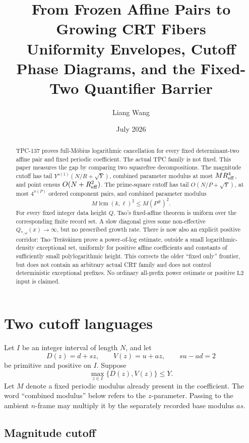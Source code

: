 \documentclass[11pt]{article}
\title{\textbf{From Frozen Affine Pairs to Growing CRT Fibers}\\
\large Uniformity Envelopes, Cutoff Phase Diagrams, and the
Fixed-Two Quantifier Barrier}
\author{Liang Wang}
\date{July 2026}
\theoremstyle{definition}
\theoremstyle{remark}
\newcommand{\Ltwo}{\mathrm{L2}}
\begin{document}
\maketitle

\begin{abstract}
TPC-137 proves full-M\"obius logarithmic cancellation for every
fixed determinant-two affine pair and fixed periodic coefficient.
The actual TPC family is not fixed.  This paper measures the gap by
comparing two squarefree decompositions.  The magnitude cutoff has
tail \(Y^{o(1)}(N/R+\sqrt Y)\), combined parameter modulus at most
\(MR_{\rm eff}^4\), and point census \(O(N+R_{\rm eff}^2)\).  The
prime-square cutoff has tail \(O(N/P+\sqrt Y)\), at most
\(4^{\pi(P)}\) ordered component pairs, and combined parameter
modulus
\[
 M\operatorname{lcm}(k,\ell)^2\le M(P^\#)^2.
\]
For every fixed integer data height \(Q\), Tao's fixed-affine
theorem is uniform over the corresponding finite record set.
A slow diagonal gives some non-effective
\(Q_{*,\omega}(x)\to\infty\), but no prescribed growth rate.
There is now also an explicit positive corridor:
Tao--Ter\"av\"ainen prove a power-of-log estimate, outside a small
logarithmic-density exceptional set, uniformly for positive affine
coefficients and constants of sufficiently small polylogarithmic
height.  This corrects the older ``fixed only'' frontier, but does
not contain an arbitrary actual CRT family and does not control
deterministic exceptional prefixes.  No ordinary all-prefix power
estimate or positive \(\Ltwo\) input is claimed.
\end{abstract}

\section{Two cutoff languages}

Let \(I\) be an integer interval of length \(N\), and let
\[
 D(z)=d+sz,\qquad V(z)=u+az,\qquad su-ad=2
\]
be primitive and positive on \(I\).  Suppose
\[
 \max_{z\in I}\{D(z),V(z)\}\le Y.
\]
Let \(M\) denote a fixed periodic modulus already present in the
coefficient.  The word ``combined modulus'' below refers to the
\(z\)-parameter.  Passing to the ambient \(n\)-frame may multiply
it by the separately recorded base modulus \(as\).

\subsection{Magnitude cutoff}
\end{document}
